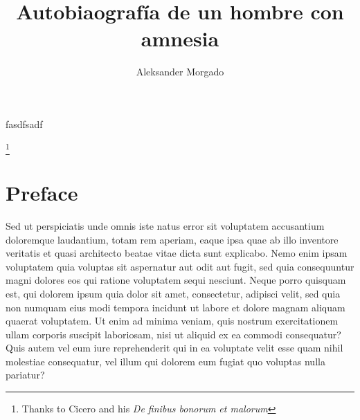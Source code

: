 \documentclass{book}
\begin{document}
\pagestyle{empty}
\title{\textbf{Autobiaografía de un hombre con amnesia}}
\author{Aleksander Morgado}
fasdfsadf


\maketitle


\thispagestyle{empty}
\thanks{Thanks to Cicero and his \em{De finibus bonorum et malorum}}
\newpage




\pagestyle{fancy}
\fancyhf{}
\lhead[]{\thepage}
\rhead[\thepage]{}


\doublespacing



\chapter*{Preface}

Sed ut perspiciatis unde omnis iste natus error sit voluptatem accusantium
doloremque laudantium, totam rem aperiam, eaque ipsa quae ab illo inventore
veritatis et quasi architecto beatae vitae dicta sunt explicabo. Nemo enim
ipsam voluptatem quia voluptas sit aspernatur aut odit aut fugit, sed quia
consequuntur magni dolores eos qui ratione voluptatem sequi nesciunt. Neque
porro quisquam est, qui dolorem ipsum quia dolor sit amet, consectetur,
adipisci velit, sed quia non numquam eius modi tempora incidunt ut labore et
dolore magnam aliquam quaerat voluptatem. Ut enim ad minima veniam, quis nostrum
exercitationem ullam corporis suscipit laboriosam, nisi ut aliquid ex ea
commodi consequatur? Quis autem vel eum iure reprehenderit qui in ea voluptate
velit esse quam nihil molestiae consequatur, vel illum qui dolorem eum fugiat
quo voluptas nulla pariatur?
\end{document}
